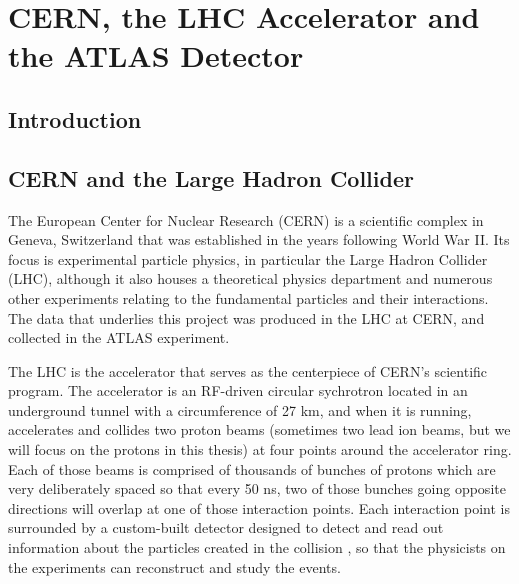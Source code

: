  

\chapter[ATLAS Detector]{CERN, the LHC Accelerator and the ATLAS Detector}




\section{Introduction}

\section{CERN and the Large Hadron Collider}
\label{sec:cern_lhc}
The European Center for Nuclear Research (CERN) is a scientific complex in Geneva, Switzerland that was established 
in the years following World War II.  Its focus is experimental particle physics, in particular the Large Hadron 
Collider (LHC), although it also houses a theoretical physics department and numerous other experiments relating to the fundamental 
particles and their interactions.  The data that underlies this project was produced in the LHC at CERN, and 
collected in the ATLAS experiment.   

The LHC is the accelerator that serves as the centerpiece of CERN's scientific program.  The accelerator is 
an RF-driven circular sychrotron located in an underground tunnel with a circumference of 27 km, and when 
it is running, accelerates and collides two proton beams (sometimes two lead ion beams, but we will 
focus on the protons in this thesis) at four points around the accelerator ring.  Each of those beams 
is comprised of thousands of bunches of protons which are very deliberately spaced so that every 50 ns, two 
of those bunches going opposite directions will overlap at one of those interaction points.  Each interaction point is surrounded 
by a custom-built detector designed to detect and read out information about the particles created in the collision
, so that the physicists on the experiments can reconstruct and study the events.  


